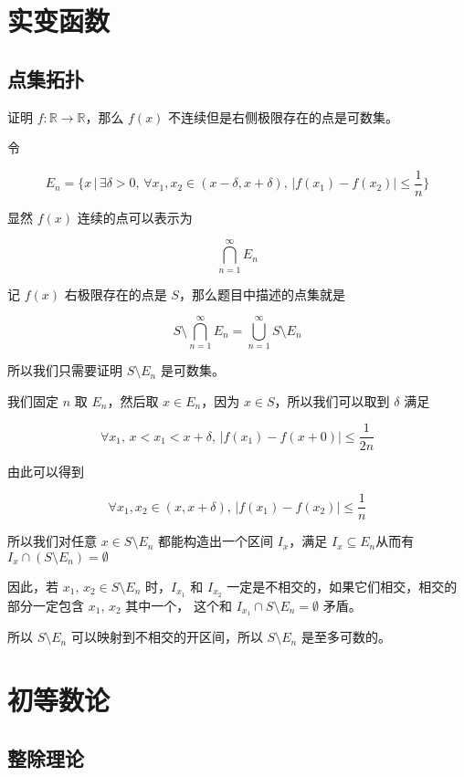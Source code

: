 \documentclass[12pt,a4paper]{ctexart}
\begin{document}
\section{实变函数}

\subsection{点集拓扑}

证明 $f: \mathbb{R} \to \mathbb{R}$，那么 $f(x)$ 不连续但是右侧极限存在的点是可数集。

令 

\[
E_n = \{ x \,\vert\, \exists \delta > 0,\, \forall x_1,x_2 \in (x-\delta, x+\delta),\, \lvert f(x_1) - f(x_2) \rvert \le \frac{1}{n}\}
\]

显然 $f(x)$ 连续的点可以表示为

\[
\bigcap_{n=1}^{\infty}E_n
\]

记 $f(x)$ 右极限存在的点是 $S$，那么题目中描述的点集就是

\[
S \setminus \bigcap_{n=1}^{\infty}E_n = \bigcup_{n=1}^{\infty}S \setminus E_n
\]

所以我们只需要证明 $S \setminus E_n$ 是可数集。

我们固定 $n$ 取 $E_n$，然后取 $x \in E_n$，因为 $x \in S$，所以我们可以取到 $\delta$ 满足

\[
\forall x_1,\, x<x_1 < x+ \delta,\, \lvert f(x_1) - f(x+0) \rvert \le \frac{1}{2n}
\]

由此可以得到


\[
\forall x_1,x_2 \in (x, x+\delta),\, \lvert f(x_1) - f(x_2) \rvert \le \frac{1}{n}
\]

所以我们对任意 $x \in S \setminus E_n$ 都能构造出一个区间 $I_x$，满足 $I_x \subseteq E_n$从而有 $I_x \cap (S \setminus E_n) = \emptyset$

因此，若 $x_1,\, x_2 \in S \setminus E_n$ 时，$I_{x_1}$ 和 $I_{x_2}$ 一定是不相交的，如果它们相交，相交的部分一定包含 $x_1,\, x_2$ 其中一个，
这个和 $I_{x_1} \cap S \setminus E_n = \emptyset$ 矛盾。

所以 $S \setminus E_n$ 可以映射到不相交的开区间，所以 $S \setminus E_n$ 是至多可数的。

\section{初等数论}

\subsection{整除理论}
\end{document}

